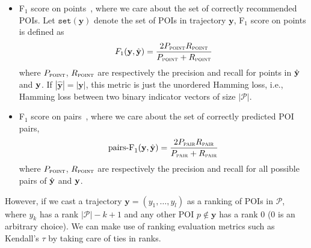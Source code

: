 \begin{itemize}
  \item F$_1$ score on points~\cite{ijcai15}, where we care about the set of correctly recommended POIs.
      Let $\texttt{set}(\mathbf{y})$ denote the set of POIs in trajectory $\mathbf{y}$, F$_1$ score on points is defined as
\begin{equation*}
F_1(\mathbf{y}, \hat{\mathbf{y}}) = \frac{2  P_{\textsc{point}}  R_{\textsc{point}}}{P_{\textsc{point}} + R_{\textsc{point}}}
\end{equation*}
where $P_\textsc{point}$, $R_\textsc{point}$ are respectively the precision and recall for points in $\hat{\mathbf{y}}$ and $\mathbf{y}$.
If $| \hat{\mathbf{y}} | = | \mathbf{y} |$, this metric is just the unordered Hamming loss,
i.e., Hamming loss between two binary indicator vectors of size $| \mathcal{P} |$.

\item F$_1$ score on pairs~\cite{cikm16paper}, where we care about the set of correctly predicted POI pairs,
\begin{equation*}
\text{pairs-F}_1(\mathbf{y}, \hat{\mathbf{y}}) = \frac{2 P_{\textsc{pair}} R_{\textsc{pair}}}{P_{\textsc{pair}} + R_{\textsc{pair}}}
\end{equation*}
where $P_\textsc{point}$, $R_\textsc{point}$ are respectively the precision and recall for all possible pairs of $\hat{\mathbf{y}}$ and $\mathbf{y}$.

\end{itemize}

However, if we cast a trajectory $\mathbf{y} = (y_1,\dots,y_l)$ as a ranking of POIs in $\mathcal{P}$,
where $y_k$ has a rank $| \mathcal{P} | - k + 1$ and any other POI $p \notin \mathbf{y}$ has a rank $0$ ($0$ is an arbitrary choice).
We can make use of ranking evaluation metrics such as Kendall's $\tau$ by taking care of ties in ranks.


